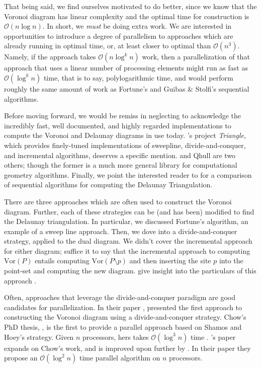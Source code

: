 \documentclass[12pt,twoside]{reedthesis}
\begin{document}
    That being said, we find ourselves motivated to do better, since we know that the Voronoi diagram has linear complexity and the optimal time for construction is $\mathcal{O}(n\log n)$. In short, we \emph{must} be doing extra work. We are interested in opportunities to introduce a degree of parallelism to approaches which are already running in optimal time, or, at least closer to optimal than $\mathcal{O}(n^3)$. Namely, if the approach takes $\mathcal{O}(n\log^k n)$ work, then a parallelization of that approach that uses a linear number of processing elements might run as fast as $\mathcal{O}(\log^k n)$ time, that is to say, polylogarithmic time, and would perform roughly the same amount of work as Fortune's and Guibas \& Stolfi's sequential algorithms. \par

    Before moving forward, we would be remiss in neglecting to acknowledge the incredibly fast, well documented, and highly regarded implementations to compute the Voronoi and Delaunay diagrams in use today. \citeauthor{shewchuk1996}'s project \emph{Triangle}, which provides finely-tuned implementations of sweepline, divide-and-conquer, and incremental algorithms, deserves a specific mention. \textcite{cgal} and Qhull \cite{qhull} are two others; though the former is a much more general library for computational geometry algorithms. Finally, we point the interested reader to \textcite{su} for a comparison of sequential algorithms for computing the Delaunay Triangulation. \par

    There are three approaches which are often used to construct the Voronoi diagram. Further, each of these strategies can be (and has been) modified to find the Delaunay triangulation. In particular, we discussed Fortune's algorithm, an example of a sweep line approach. Then, we dove into a divide-and-conquer strategy, applied to the dual diagram. We didn't cover the incremental approach for either diagram; suffice it to say that the incremental approach to computing $\mbox{Vor}(P)$ entails computing $\mbox{Vor}(P\setminus {p})$ and then inserting the site $p$ into the point-set and computing the new diagram. \citeauthor*{guibas2} give insight into the particulars of this approach \cite{guibas2}.\par

    Often, approaches that leverage the divide-and-conquer paradigm are good candidates for parallelization. In their \citeyear{shamos_hoey} paper , \textcite{shamos_hoey} presented the first approach to constructing the Voronoi diagram using a divide-and-conquer strategy. Chow's PhD thesis, , is the first to provide a parallel approach based on Shamos and Hoey's strategy. Given $n$ processors, hers takes $\mathcal{O}(\log^3 n)$ time \cite{chow}. \citeauthor*{aggarwal}'s paper \cite{aggarwal} expands on Chow's work, and is improved upon further by \textcite{goodrich1985}. In their paper  they propose an $\mathcal{O}(\log^2 n)$ time parallel algorithm on $n$ processors.\par 
\end{document}
